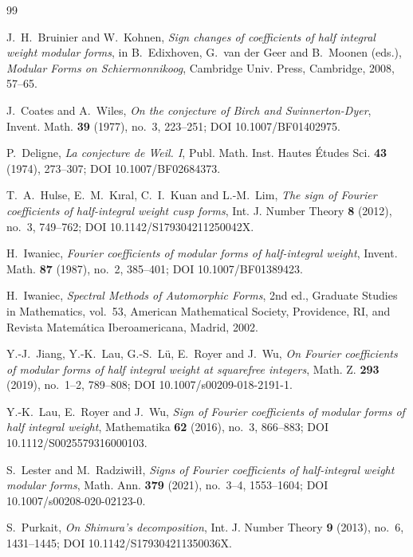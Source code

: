 \documentclass[11pt]{amsart}
\theoremstyle{remark}
\begin{document}
\begin{thebibliography}{99}

J.~H.~Bruinier and W.~Kohnen,
\emph{Sign changes of coefficients of half integral weight modular forms},
in B.~Edixhoven, G.~van der Geer and B.~Moonen (eds.),
\emph{Modular Forms on Schiermonnikoog},
Cambridge Univ. Press, Cambridge, 2008, 57--65.

J.~Coates and A.~Wiles,
\emph{On the conjecture of Birch and Swinnerton-Dyer},
Invent. Math. \textbf{39} (1977), no.~3, 223--251;
DOI 10.1007/BF01402975.

P.~Deligne,
\emph{La conjecture de Weil. I},
Publ. Math. Inst. Hautes {\'E}tudes Sci. \textbf{43} (1974), 273--307; DOI 10.1007/BF02684373.

T.~A.~Hulse, E.~M.~K{\i}ral, C.~I.~Kuan and L.-M.~Lim,
\emph{The sign of Fourier coefficients of half-integral weight cusp forms},
Int. J. Number Theory \textbf{8} (2012), no.~3, 749--762; DOI 10.1142/S179304211250042X.

H.~Iwaniec,
\emph{Fourier coefficients of modular forms of half-integral weight},
Invent. Math. \textbf{87} (1987), no.~2, 385--401; DOI 10.1007/BF01389423.

H.~Iwaniec,
\emph{Spectral Methods of Automorphic Forms}, 2nd ed.,
Graduate Studies in Mathematics, vol.~53,
American Mathematical Society, Providence, RI, and Revista Matem\'atica
Iberoamericana, Madrid, 2002.

Y.-J.~Jiang, Y.-K.~Lau, G.-S.~L{\"u}, E.~Royer and J.~Wu,
\emph{On Fourier coefficients of modular forms of half integral weight at squarefree integers},
Math. Z. \textbf{293} (2019), no.~1--2, 789--808; DOI 10.1007/s00209-018-2191-1.

Y.-K.~Lau, E.~Royer and J.~Wu,
\emph{Sign of Fourier coefficients of modular forms of half integral weight},
Mathematika \textbf{62} (2016), no.~3, 866--883; DOI 10.1112/S0025579316000103.

S.~Lester and M.~Radziwi{\l}{\l},
\emph{Signs of Fourier coefficients of half-integral weight modular forms},
Math. Ann. \textbf{379} (2021), no.~3--4, 1553--1604; DOI 10.1007/s00208-020-02123-0.


S.~Purkait,
\emph{On Shimura's decomposition},
Int. J. Number Theory \textbf{9} (2013), no.~6, 1431--1445; DOI 10.1142/S179304211350036X.


\end{thebibliography}
\end{document}
